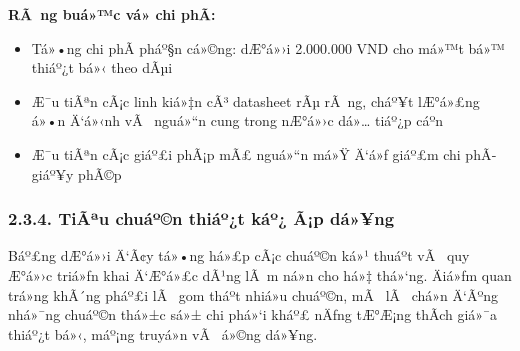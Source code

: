 \documentclass[a4paper]{extarticle}
\providecommand{\tightlist}{%
  \setlength{\itemsep}{0pt}\setlength{\parskip}{0pt}}
\begin{document}
\textbf{RÃ ng buá»™c vá» chi phÃ­:}

\begin{itemize}
\tightlist
\item
  Tá»•ng chi phÃ­ pháº§n cá»©ng: dÆ°á»›i 2.000.000 VND cho má»™t bá»™ thiáº¿t bá»‹ theo dÃµi
\item
  Æ¯u tiÃªn cÃ¡c linh kiá»‡n cÃ³ datasheet rÃµ rÃ ng, cháº¥t lÆ°á»£ng á»•n Ä‘á»‹nh vÃ 
  nguá»“n cung trong nÆ°á»›c dá»… tiáº¿p cáº­n
\item
  Æ¯u tiÃªn cÃ¡c giáº£i phÃ¡p mÃ£ nguá»“n má»Ÿ Ä‘á»ƒ giáº£m chi phÃ­ giáº¥y phÃ©p
\end{itemize}

\subsubsection{2.3.4. TiÃªu chuáº©n thiáº¿t káº¿ Ã¡p
dá»¥ng}\label{234-tiuxeau-chuux1ea9n-thiux1ebft-kux1ebf-uxe1p-dux1ee5ng}

Báº£ng dÆ°á»›i Ä‘Ã¢y tá»•ng há»£p cÃ¡c chuáº©n ká»¹ thuáº­t vÃ  quy Æ°á»›c triá»ƒn khai Ä‘Æ°á»£c dÃ¹ng
lÃ m ná»n cho há»‡ thá»‘ng. Äiá»ƒm quan trá»ng khÃ´ng pháº£i lÃ  gom tháº­t nhiá»u chuáº©n,
mÃ  lÃ  chá»n Ä‘Ãºng nhá»¯ng chuáº©n thá»±c sá»± chi phá»‘i kháº£ nÄƒng tÆ°Æ¡ng thÃ­ch giá»¯a
thiáº¿t bá»‹, máº¡ng truyá»n vÃ  á»©ng dá»¥ng.
\end{document}
